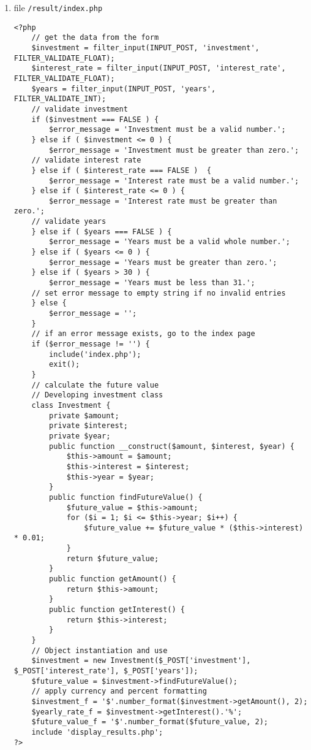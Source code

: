 \begin{enumerate}
\item file \texttt{/result/index.php}
\lstset{language=php,tabsize=2}
\begin{lstlisting}
<?php
	// get the data from the form
	$investment = filter_input(INPUT_POST, 'investment', FILTER_VALIDATE_FLOAT);
	$interest_rate = filter_input(INPUT_POST, 'interest_rate', FILTER_VALIDATE_FLOAT);
	$years = filter_input(INPUT_POST, 'years', FILTER_VALIDATE_INT);
	// validate investment
	if ($investment === FALSE ) {
		$error_message = 'Investment must be a valid number.'; 
	} else if ( $investment <= 0 ) {
		$error_message = 'Investment must be greater than zero.'; 
	// validate interest rate
	} else if ( $interest_rate === FALSE )  {
		$error_message = 'Interest rate must be a valid number.'; 
	} else if ( $interest_rate <= 0 ) {
		$error_message = 'Interest rate must be greater than zero.'; 
	// validate years
	} else if ( $years === FALSE ) {
		$error_message = 'Years must be a valid whole number.';
	} else if ( $years <= 0 ) {
		$error_message = 'Years must be greater than zero.';
	} else if ( $years > 30 ) {
		$error_message = 'Years must be less than 31.';
	// set error message to empty string if no invalid entries
	} else {
		$error_message = ''; 
	}
	// if an error message exists, go to the index page
	if ($error_message != '') {
		include('index.php');
		exit(); 
	}
	// calculate the future value
	// Developing investment class
	class Investment {
		private $amount;
		private $interest;
		private $year;
		public function __construct($amount, $interest, $year) {
			$this->amount = $amount;
			$this->interest = $interest;
			$this->year = $year;
		}
		public function findFutureValue() {
			$future_value = $this->amount;
			for ($i = 1; $i <= $this->year; $i++) {
				$future_value += $future_value * ($this->interest) * 0.01;
			}
			return $future_value;
		}
		public function getAmount() {
			return $this->amount;
		}
		public function getInterest() {
			return $this->interest;
		}
	}
	// Object instantiation and use
	$investment = new Investment($_POST['investment'], $_POST['interest_rate'], $_POST['years']);
	$future_value = $investment->findFutureValue();
	// apply currency and percent formatting
	$investment_f = '$'.number_format($investment->getAmount(), 2);
	$yearly_rate_f = $investment->getInterest().'%';
	$future_value_f = '$'.number_format($future_value, 2);
	include 'display_results.php';
?>
\end{lstlisting}


\end{enumerate}
